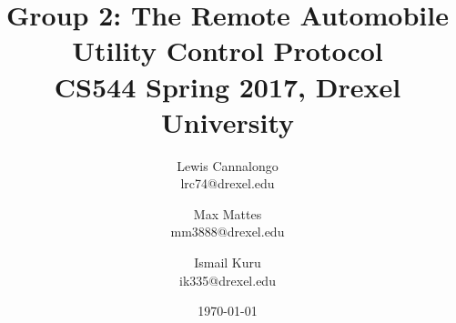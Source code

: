 \documentclass[12pt]{usenixsubmit}
\begin{document}

\title{Group 2: The Remote Automobile Utility Control Protocol \\ \Large{CS544 Spring 2017, Drexel University}}

\author{
    Lewis Cannalongo \\
    lrc74@drexel.edu
    \and
     Max Mattes \\
    mm3888@drexel.edu
    \and
    Ismail Kuru \\
    ik335@drexel.edu
}
\date{\today}

\maketitle

\thispagestyle{empty}



\tableofcontents
\pagebreak

\setcounter{page}{1}











%
%



%
\end{document}
